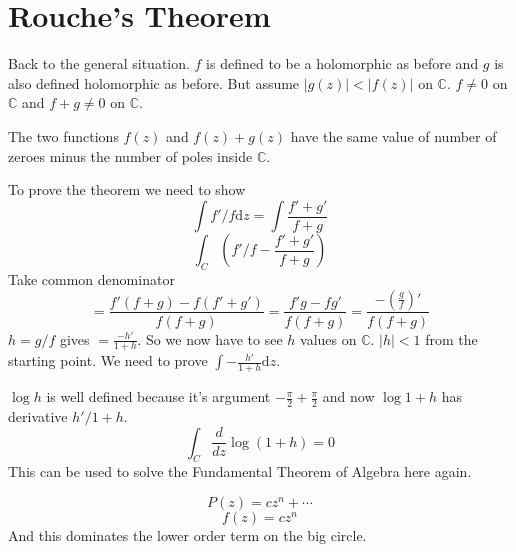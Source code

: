 \documentclass[letter]{article}
\begin{document}
\section*{Rouche's Theorem} 
Back to the general situation. $f$ is defined to be a holomorphic as before and $g$ is also defined holomorphic as before. But assume $|g(z)| < |f(z) | $ on $\mathbb{C}$. $f\neq 0 $ on $\mathbb{C}$ and $f + g \neq  0 $ on $\mathbb{C}$.

The two functions $f(z)$ and $f(z) + g(z)$ have the same value of number of zeroes minus the number of poles inside $\mathbb{C}$. 

To prove the theorem we need to show 
\[
\int f'/f \mathrm{d} z = \int \frac{f' + g'}{f + g}
\]  
\[
\int_C \left(
f'/f - \frac{f' + g'}{f+ g}
\right)
\] 
Take common denominator
\[
= \frac{f' (f+g) - f(f'+g') }{f(f+g)} = 
\frac{f'g - fg' }{f(f+g)} 
= 
\frac{ - \left(\frac{g}{f}\right)'}{f(f+g)}
\]
$h = g / f$ gives $ = \frac{- h' }{1  + h}$. So we now have to see $h$ values on $\mathbb{C}$. 
$|h| < 1$ from the starting point. We need to prove $\int - \frac{h'}{1+h} \mathrm{d} z$. 

$\log h$ is well defined because it's argument $- \frac{\pi}{2} + \frac{\pi}{2}$ and now 
$\log 1+h$ has derivative $h'/1+h$. 
\[
\int_C \frac{d}{dz} \log( 1+ h) = 0
\]
This can be used to solve the Fundamental Theorem of Algebra here again. 

\[
P(z) = cz^{n } + \cdots
\] 
\[
f(z) = cz^{n}
\] 
And this dominates the  lower order term on the big circle. 
\end{document}
